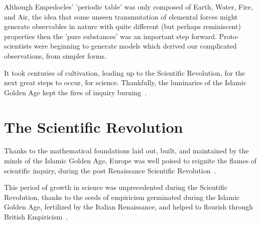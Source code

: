 Although Empedocles' 'periodic table' was only composed of Earth, Water, Fire,
and Air, the idea that some unseen transmutation of elemental forces might
generate observables in nature with quite different (but perhaps reminiscent)
properties then the 'pure substances' was an important step forward.
Proto-scientists were beginning to generate models which derived our complicated
observations, from simpler forms.

It took centuries of cultivation, leading up to the Scientific Revolution, for
the next great steps to occur, for science. Thankfully, the luminaries of the
Islamic Golden Age kept the fires of inquiry burning~\cite{Alexakos2005}.

\clearpage
\section{The Scientific Revolution}

Thanks to the mathematical foundations laid out, built, and maintained by the
minds of the Islamic Golden Age, Europe was well poised to reignite the flames
of scientific inquiry, during the post Renaissance Scientific
Revolution~\cite{Alexakos2005}.

This period of growth in science was unprecedented during the Scientific
Revolution, thanks to the seeds of empiricism germinated during the Islamic
Golden Age, fertilized by the Italian Renaissance, and helped to flourish
through British Empiricism~\cite{Cowley1968}.

